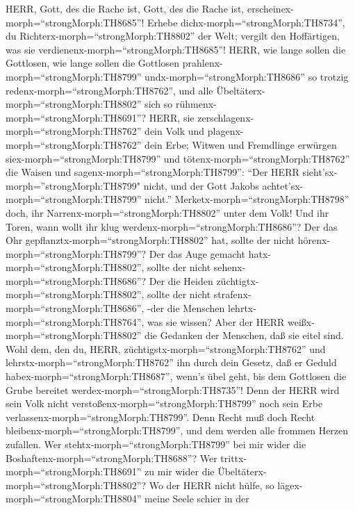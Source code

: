  HERR, Gott, des die Rache ist, Gott, des die Rache ist,
erscheinex-morph=``strongMorph:TH8685''!  Erhebe
dichx-morph=``strongMorph:TH8734'', du
Richterx-morph=``strongMorph:TH8802'' der Welt; vergilt den Hoffärtigen,
was sie verdienenx-morph=``strongMorph:TH8685''!  HERR, wie
lange sollen die Gottlosen, wie lange sollen die Gottlosen
prahlenx-morph=``strongMorph:TH8799'' 
undx-morph=``strongMorph:TH8686'' so trotzig
redenx-morph=``strongMorph:TH8762'', und alle
Übeltäterx-morph=``strongMorph:TH8802'' sich so
rühmenx-morph=``strongMorph:TH8691''?  HERR, sie
zerschlagenx-morph=``strongMorph:TH8762'' dein Volk und
plagenx-morph=``strongMorph:TH8762'' dein Erbe;  Witwen und
Fremdlinge erwürgen siex-morph=``strongMorph:TH8799'' und
tötenx-morph=``strongMorph:TH8762'' die Waisen  und
sagenx-morph=``strongMorph:TH8799'': ``Der HERR
sieht'sx-morph=''strongMorph:TH8799" nicht, und der Gott Jakobs
achtet'sx-morph=``strongMorph:TH8799'' nicht.'' 
Merketx-morph=``strongMorph:TH8798'' doch, ihr
Narrenx-morph=``strongMorph:TH8802'' unter dem Volk! Und ihr Toren, wann
wollt ihr klug werdenx-morph=``strongMorph:TH8686''?  Der
das Ohr gepflanztx-morph=``strongMorph:TH8802'' hat, sollte der nicht
hörenx-morph=``strongMorph:TH8799''? Der das Auge gemacht
hatx-morph=``strongMorph:TH8802'', sollte der nicht
sehenx-morph=``strongMorph:TH8686''?  Der die Heiden
züchtigtx-morph=``strongMorph:TH8802'', sollte der nicht
strafenx-morph=``strongMorph:TH8686'', -der die Menschen
lehrtx-morph=``strongMorph:TH8764'', was sie wissen?  Aber
der HERR weißx-morph=``strongMorph:TH8802'' die Gedanken der Menschen,
daß sie eitel sind.  Wohl dem, den du, HERR,
züchtigstx-morph=``strongMorph:TH8762'' und
lehrstx-morph=``strongMorph:TH8762'' ihn durch dein Gesetz,
 daß er Geduld habex-morph=``strongMorph:TH8687'', wenn's
übel geht, bis dem Gottlosen die Grube bereitet
werdex-morph=``strongMorph:TH8735''!  Denn der HERR wird
sein Volk nicht verstoßenx-morph=``strongMorph:TH8799'' noch sein Erbe
verlassenx-morph=``strongMorph:TH8799''.  Denn Recht muß
doch Recht bleibenx-morph=``strongMorph:TH8799'', und dem werden alle
frommen Herzen zufallen.  Wer
stehtx-morph=``strongMorph:TH8799'' bei mir wider die
Boshaftenx-morph=``strongMorph:TH8688''? Wer
trittx-morph=``strongMorph:TH8691'' zu mir wider die
Übeltäterx-morph=``strongMorph:TH8802''?  Wo der HERR nicht
hülfe, so lägex-morph=``strongMorph:TH8804'' meine Seele schier in der
